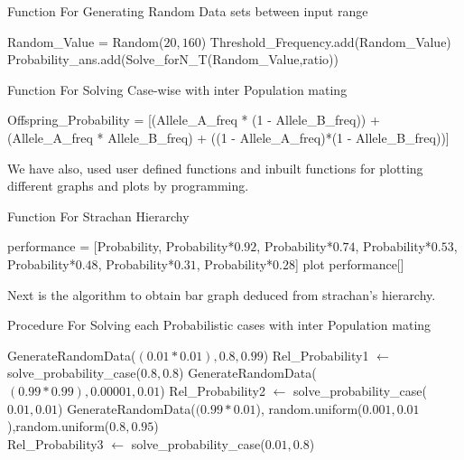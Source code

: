 \documentclass{article}
\begin{document}
\begin{algorithm}
\caption{Function For Generating Random Data sets between input range}
\begin{algorithmic}[1]
        \State Random\_Value = Random($20,160$) 
        \State Threshold\_Frequency.add(Random\_Value)
        \State Probability\_ans.add(Solve\_forN\_T(Random\_Value,ratio))
        \EndFor
\EndFunction
\end{algorithmic}
\end{algorithm}

\begin{algorithm}
\caption{Function For Solving Case-wise with inter Population mating}
\begin{algorithmic}[1]
    \State Offspring\_Probability = [(Allele\_A\_freq * (1 - Allele\_B\_freq)) + (Allele\_A\_freq * Allele\_B\_freq) + ((1 - Allele\_A\_freq)*(1 - Allele\_B\_freq))]
    \State {}  
\EndFunction
\end{algorithmic}
\end{algorithm}

We have also, used user defined functions and inbuilt functions for plotting different graphs and plots by programming.\\

\begin{algorithm}
\caption{Function For Strachan Hierarchy}
\begin{algorithmic}[1]
    \State performance = [Probability, Probability*$0.92$, Probability*$0.74$,
                   Probability*$0.53$, Probability*$0.48$, Probability*$0.31$, Probability*$0.28$]
    \State plot performance[]
    \State {}  
\EndFunction
\end{algorithmic}
\end{algorithm}

Next is the algorithm to obtain bar graph deduced from strachan's hierarchy.

\begin{algorithm}
\caption{Procedure For Solving each Probabilistic cases with inter Population mating}
\begin{algorithmic}[1]
    \State GenerateRandomData($(0.01*0.01), 0.8, 0.99$)     
    \State Rel\_Probability1 $\leftarrow$ solve\_probability\_case($0.8, 0.8$)
    \State GenerateRandomData($(0.99*0.99), 0.00001, 0.01$)    
    \State Rel\_Probability2 $\leftarrow$ solve\_probability\_case($0.01, 0.01$)
    \State GenerateRandomData($(0.99*0.01$), random.uniform($0.001, 0.01$),random.uniform($0.8, 0.95$) \\    
    \State Rel\_Probability3 $\leftarrow$ solve\_probability\_case($0.01, 0.8$)
\EndProcedure
\end{algorithmic}
\end{algorithm}
\end{document}
